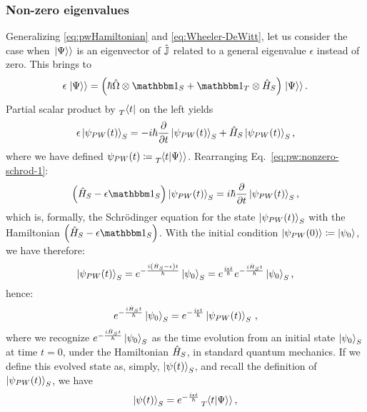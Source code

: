\subsubsection{Non-zero eigenvalues}
Generalizing \eqref{eq:pwHamiltonian} and \eqref{eq:Wheeler-DeWitt}, let us consider the case when
$\left.\left| \Psi \right\rangle\right\rangle$ is an eigenvector of $\hat{\mathbb{J}}$ related to a general eigenvalue $\epsilon$
instead of zero. This brings to
\begin{equation}\label{eq:pw:non0e:first}
  \epsilon \dket{\Psi} = \qty(\hbar\op{\Omega} \ox \idop_S + \idop_T \ox \op{H}_S) \dket{\Psi} \text{.}
\end{equation}
Partial scalar product by $\prescript{}{T}{\bra{t}}$ on the left yields
\begin{equation}\label{eq:pw:nonzero-schrod-1}
  \epsilon\ket{\psi_{PW}(t)}_{S} = -i\hbar\pdv{t}\ket{\psi_{PW}(t)}_{S} + \hat{H}_S\ket{\psi_{PW}(t)}_{S}
  \text{,}
\end{equation}
where we have defined $\psi_{PW}(t) \coloneqq \prescript{}{T}{\!\left.\left\langle t \middle| \Psi \right\rangle\right\rangle}$.
Rearranging Eq.~\eqref{eq:pw:nonzero-schrod-1}:
\begin{equation}\label{eq:pw:nonzero-schrod-2}
   \qty(\op{H}_S - \epsilon \idop_{S}) \ket{\psi_{PW}(t)}_{S} = i\hbar\pdv{t}\ket{\psi_{PW}(t)}_{S}
   \text{,}
\end{equation}
which is, formally, the Schr\"{o}dinger equation
for the state $\ket{\psi_{PW}(t)}_{S}$ with
the Hamiltonian $\qty(\op{H}_S - \epsilon \idop_{S})$.
With the initial condition $\ket{\psi_{PW}(0)} \coloneqq \ket{\psi_0}$, we have therefore:
\begin{equation}\label{eq:pw:non0e:last}
  \ket{\psi_{PW}(t)}_S = 
  e^{-\frac{i \qty(\hat{H}_{S} - \epsilon) t}{\hbar}} \ket{\psi_0}_S =
  e^{\frac{i \epsilon t}{\hbar}} e^{-\frac{i \hat{H}_{S} t}{\hbar}} \ket{\psi_0}_S
  \text{,}
\end{equation}
hence:
\begin{equation}
  e^{-\frac{i \hat{H}_{S} t}{\hbar}} \ket{\psi_0}_S = e^{-\frac{i \epsilon t}{\hbar}} \ket{\psi_{PW}(t)}_S
  \,\text{,}
\end{equation}
where we recognize $e^{-\frac{i \hat{H}_{S} t}{\hbar}} \ket{\psi_0}_S$ as the time evolution
from an initial state $\ket{\psi_0}_S$ at time $t = 0$,
under the Hamiltonian $\hat{H}_S$,
in standard quantum mechanics.
If we define this evolved state as, simply, $\ket{\psi(t)}_S$, and recall the definition of $\ket{\psi_{PW}(t)}_S$,
we have
\begin{equation}
  \ket{\psi(t)}_S = e^{-\frac{i \epsilon t}{\hbar}} \prescript{}{T}{\!\left.\left\langle t \middle| \Psi \right\rangle\right\rangle} \, \text{,}
\end{equation}
